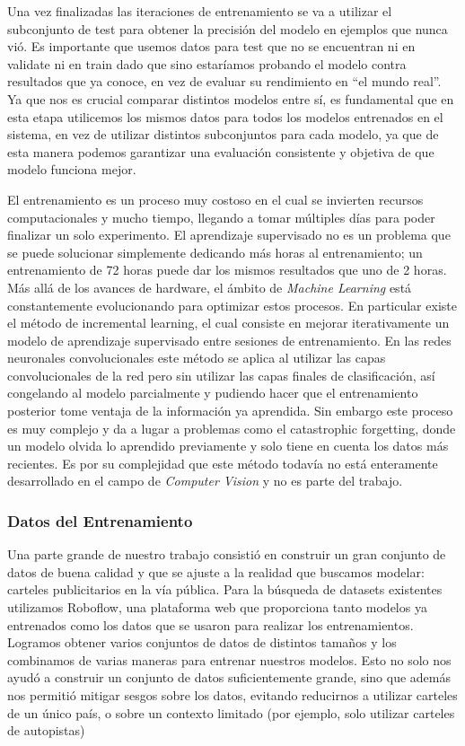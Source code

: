 \documentclass[a4paper]{article}
\begin{document}
Una vez finalizadas las iteraciones de entrenamiento se va a utilizar el subconjunto de test para obtener la precisión del modelo en ejemplos que nunca vió. Es importante que usemos datos para test que no se encuentran ni en validate ni en train dado que sino estaríamos probando el modelo contra resultados que ya conoce, en vez de evaluar su rendimiento en “el mundo real”. Ya que nos es crucial comparar distintos modelos entre sí, es fundamental que en esta etapa utilicemos los mismos datos para todos los modelos entrenados en el sistema, en vez de utilizar distintos subconjuntos para cada modelo, ya que de esta manera podemos garantizar una evaluación consistente y objetiva de que modelo funciona mejor.

El entrenamiento es un proceso muy costoso en el cual se invierten recursos computacionales y mucho tiempo, llegando a tomar múltiples días para poder finalizar un solo experimento. El aprendizaje supervisado no es un problema que se puede solucionar simplemente dedicando más horas al entrenamiento; un entrenamiento de 72 horas puede dar los mismos resultados que uno de 2 horas. Más allá de los avances de hardware, el ámbito de \textit{Machine Learning} está constantemente evolucionando para optimizar estos procesos. En particular existe el método de incremental learning, el cual consiste en mejorar iterativamente un modelo de aprendizaje supervisado entre sesiones de entrenamiento. En las redes neuronales convolucionales este método se aplica al utilizar las capas convolucionales de la red pero sin utilizar las capas finales de clasificación, así congelando al modelo parcialmente y pudiendo hacer que el entrenamiento posterior tome ventaja de la información ya aprendida. Sin embargo este proceso es muy complejo y da a lugar a problemas como el catastrophic forgetting, donde un modelo olvida lo aprendido previamente y solo tiene en cuenta los datos más recientes. Es por su complejidad que este método todavía no está enteramente desarrollado en el campo de \textit{Computer Vision} y no es parte del trabajo.

\subsubsection{Datos del Entrenamiento}

Una parte grande de nuestro trabajo consistió en construir un gran conjunto de datos de buena calidad y que se ajuste a la realidad que buscamos modelar: carteles publicitarios en la vía pública. Para la búsqueda de datasets existentes utilizamos Roboflow, una plataforma web que proporciona tanto modelos ya entrenados como los datos que se usaron para realizar los entrenamientos. Logramos obtener varios conjuntos de datos de distintos tamaños y los combinamos de varias maneras para entrenar nuestros modelos. Esto no solo nos ayudó a construir un conjunto de datos suficientemente grande, sino que además nos permitió mitigar sesgos sobre los datos, evitando reducirnos a utilizar carteles de un único país, o sobre un contexto limitado (por ejemplo, solo utilizar carteles de autopistas)
\end{document}
